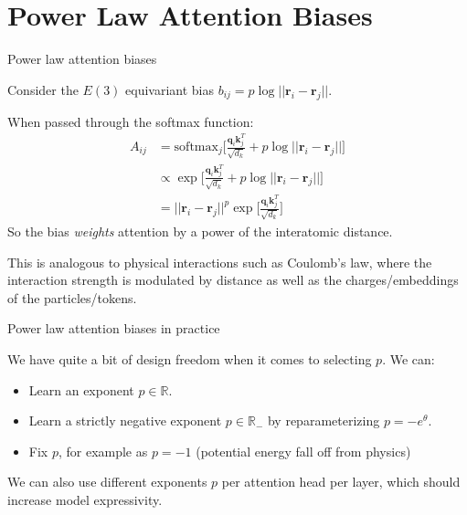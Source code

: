 \documentclass{beamer}
\begin{document}
\section{Power Law Attention Biases}

\begin{frame}{Power law attention biases}

Consider the $E(3)$ equivariant bias $b_{ij}=p \log ||\mathbf{r}_i - \mathbf{r}_j||$. 

\vspace{1em}

When passed through the softmax function:
\begin{equation*}
\begin{split}
    A_{ij} &= \text{softmax}_j \biggr [\frac{\mathbf{q}_{i} \mathbf{k}_j^T}{\sqrt{d_k}} + p \log || \mathbf{r}_i - \mathbf{r}_j || \biggr] \\
    &\propto \exp \biggr[ \frac{\mathbf{q}_{i} \mathbf{k}_j^T}{\sqrt{d_k}} + p \log || \mathbf{r}_i - \mathbf{r}_j || \biggr] \\
    &= || \mathbf{r}_i - \mathbf{r}_j ||^{p}\exp \biggr[ \frac{\mathbf{q}_{i} \mathbf{k}_j^T}{\sqrt{d_k}} \biggr]
\end{split}
\end{equation*}
So the bias \textit{weights} attention by a power of the interatomic distance. 

\vspace{1em}

This is analogous to physical interactions such as Coulomb's law, where the interaction strength is modulated by distance as well as the charges/embeddings of the particles/tokens. 

\end{frame}

\begin{frame}{Power law attention biases in practice}

We have quite a bit of design freedom when it comes to selecting $p$. We can:
\begin{itemize}
    \item Learn an exponent $p \in \mathbb{R}$. 
    \item Learn a strictly negative exponent $p \in \mathbb{R}_-$ by reparameterizing $p=-e^\theta$. 
    \item Fix $p$, for example as $p = -1$ (potential energy fall off from physics)
\end{itemize}
We can also use different exponents $p$ per attention head per layer, which should increase model expressivity. 

\end{frame}
\end{document}
